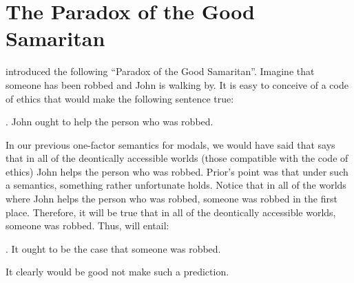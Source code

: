 %
\section{The Paradox of the Good Samaritan} \label{sec:parad-good-samar}

\citet{prior:1958:escapism} introduced the following ``Paradox of the Good Samaritan''. Imagine that someone has been robbed and John is walking by. It is easy to conceive of a code of ethics that would make the following sentence true:

\ex. John ought to help the person who was robbed.

In our previous one-factor semantics for modals, we would have said that \Last says that in all of the deontically accessible worlds (those compatible with the code of ethics) John helps the person who was robbed. Prior's point was that under such a semantics, something rather unfortunate holds. Notice that in all of the worlds where John helps the person who was robbed, someone was robbed in the first place. Therefore, it will be true that in all of the deontically accessible worlds, someone was robbed. Thus, \Last will entail:

\ex. It ought to be the case that someone was robbed.

It clearly would be good not make such a prediction.

